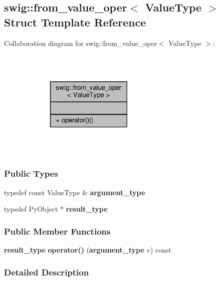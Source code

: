 \subsection{swig\+:\+:from\+\_\+value\+\_\+oper$<$ Value\+Type $>$ Struct Template Reference}
\label{structswig_1_1from__value__oper}


Collaboration diagram for swig\+:\+:from\+\_\+value\+\_\+oper$<$ Value\+Type $>$\+:
\nopagebreak
\begin{figure}[H]
\begin{center}
\leavevmode
\includegraphics[width=195pt]{de/d4c/structswig_1_1from__value__oper__coll__graph}
\end{center}
\end{figure}
\subsubsection*{Public Types}
\begin{DoxyCompactItemize}
\item 
typedef const Value\+Type \& {\bf argument\+\_\+type}
\item 
typedef Py\+Object $\ast$ {\bf result\+\_\+type}
\end{DoxyCompactItemize}
\subsubsection*{Public Member Functions}
\begin{DoxyCompactItemize}
\item 
{\bf result\+\_\+type} {\bf operator()} ({\bf argument\+\_\+type} v) const 
\end{DoxyCompactItemize}


\subsubsection{Detailed Description}
